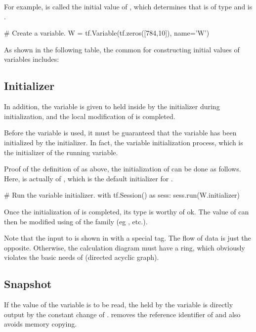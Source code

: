\begin{content}
For example,  is called the initial value of , which determines that  is of type  and  is \code{[784, 10]}.

\begin{leftbar}
\begin{python}
# Create a variable.
W = tf.Variable(tf.zeros([784,10]), name='W')
\end{python}
\end{leftbar}

As shown in the following table, the common  for constructing initial values ​​of variables includes:


\subsection{Initializer}
In addition, the variable is given to  held inside  by the initializer  during initialization, and the local modification of  is completed.

Before the variable is used, it must be guaranteed that the variable has been initialized by the initializer. In fact, the variable initialization process, which is the initializer of the running variable.

Proof of the definition of  as above, the initialization of  can be done as follows. Here,  is actually  of , which is the default initializer for .

\begin{leftbar}
\begin{python}
# Run the variable initializer.
with tf.Session() as sess:
  sess.run(W.initializer)
\end{python}
\end{leftbar}

Once the initialization of  is completed, its type is worthy of ok. The value of  can then be modified using  of the  family (eg , etc.).

Note that the input to  is shown in  with a special  tag. The flow of data is just the opposite. Otherwise, the calculation diagram must have a ring, which obviously violates the basic needs of  (directed acyclic graph).


\subsection{Snapshot}
If the value of the variable is to be read, the  held by the variable is directly output by the constant change of .  removes the reference identifier of  and also avoids memory copying.


\end{content}
